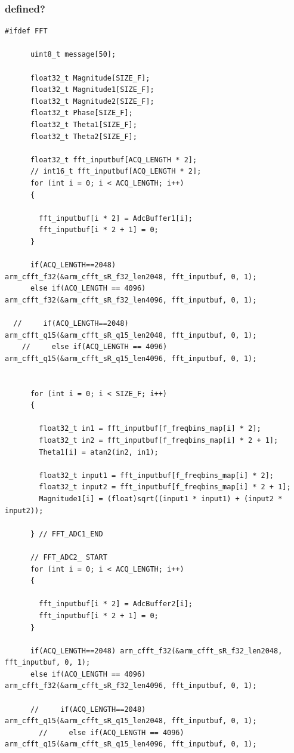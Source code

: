 \subsubsection{ defined?}
\begin{lstlisting}
#ifdef FFT

      uint8_t message[50];

      float32_t Magnitude[SIZE_F];
      float32_t Magnitude1[SIZE_F];
      float32_t Magnitude2[SIZE_F];
      float32_t Phase[SIZE_F];
      float32_t Theta1[SIZE_F];
      float32_t Theta2[SIZE_F];

      float32_t fft_inputbuf[ACQ_LENGTH * 2];
      // int16_t fft_inputbuf[ACQ_LENGTH * 2];
      for (int i = 0; i < ACQ_LENGTH; i++)
      {

        fft_inputbuf[i * 2] = AdcBuffer1[i];
        fft_inputbuf[i * 2 + 1] = 0;
      }

      if(ACQ_LENGTH==2048)       arm_cfft_f32(&arm_cfft_sR_f32_len2048, fft_inputbuf, 0, 1);
      else if(ACQ_LENGTH == 4096) arm_cfft_f32(&arm_cfft_sR_f32_len4096, fft_inputbuf, 0, 1);

  //     if(ACQ_LENGTH==2048)       arm_cfft_q15(&arm_cfft_sR_q15_len2048, fft_inputbuf, 0, 1);
    //     else if(ACQ_LENGTH == 4096) arm_cfft_q15(&arm_cfft_sR_q15_len4096, fft_inputbuf, 0, 1);


      for (int i = 0; i < SIZE_F; i++)
      {

        float32_t in1 = fft_inputbuf[f_freqbins_map[i] * 2];
        float32_t in2 = fft_inputbuf[f_freqbins_map[i] * 2 + 1];
        Theta1[i] = atan2(in2, in1);

        float32_t input1 = fft_inputbuf[f_freqbins_map[i] * 2];
        float32_t input2 = fft_inputbuf[f_freqbins_map[i] * 2 + 1];
        Magnitude1[i] = (float)sqrt((input1 * input1) + (input2 * input2));

      } // FFT_ADC1_END

      // FFT_ADC2_ START
      for (int i = 0; i < ACQ_LENGTH; i++)
      {

        fft_inputbuf[i * 2] = AdcBuffer2[i];
        fft_inputbuf[i * 2 + 1] = 0;
      }

      if(ACQ_LENGTH==2048) arm_cfft_f32(&arm_cfft_sR_f32_len2048, fft_inputbuf, 0, 1);
      else if(ACQ_LENGTH == 4096) arm_cfft_f32(&arm_cfft_sR_f32_len4096, fft_inputbuf, 0, 1);

      //     if(ACQ_LENGTH==2048)       arm_cfft_q15(&arm_cfft_sR_q15_len2048, fft_inputbuf, 0, 1);
        //     else if(ACQ_LENGTH == 4096) arm_cfft_q15(&arm_cfft_sR_q15_len4096, fft_inputbuf, 0, 1);


\end{lstlisting}
